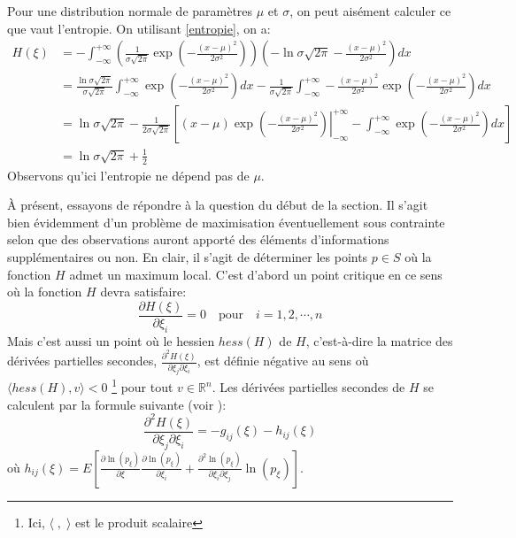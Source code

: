 \documentclass[11pt, letterpaper]{article}
\begin{document}
	Pour une distribution normale de paramètres $\mu$ et $\sigma$, on peut aisément calculer ce que vaut l'entropie. On utilisant \eqref{entropie}, on a:
	\begin{align*}
	 H(\xi)&= -\int_{-\infty}^{+\infty}\left(\frac{1}{\sigma\sqrt{2\pi}}\exp\left(-\frac{(x-\mu)^2}{2\sigma^2}\right)\right)\left(-\ln\sigma\sqrt{2\pi}-\frac{(x-\mu)^2}{2\sigma^2}\right)dx\\
	 &=\frac{\ln\sigma\sqrt{2\pi}}{\sigma\sqrt{2\pi}}\int_{-\infty}^{+\infty}\exp\left(-\frac{(x-\mu)^2}{2\sigma^2}\right)dx-\frac{1}{\sigma\sqrt{2\pi}}\int_{-\infty}^{+\infty}-\frac{(x-\mu)^2}{2\sigma^2}\exp\left(-\frac{(x-\mu)^2}{2\sigma^2}\right)dx\\
	 &=\ln\sigma\sqrt{2\pi}-\frac{1}{2\sigma\sqrt{2\pi}}\left[\left.(x-\mu)\exp\left(-\frac{(x-\mu)^2}{2\sigma^2}\right)\right|_{-\infty}^{+\infty}-\int_{-\infty}^{+\infty}\exp\left(-\frac{(x-\mu)^2}{2\sigma^2}\right)dx\right]\\
	 &=\ln\sigma\sqrt{2\pi}+\frac{1}{2}
	\end{align*}
	Observons qu'ici l'entropie ne dépend pas de $\mu$.
	\newline
	
	À présent, essayons de répondre à la question du début de la section. Il s'agit bien évidemment d'un problème de maximisation éventuellement sous contrainte selon que des observations auront apporté des éléments d'informations supplémentaires ou non. En clair, il s'agit de déterminer les points $p\in S$ où la fonction $H$ admet un maximum local. C'est d'abord un point critique en ce sens où la fonction $H$ devra satisfaire:
	\begin{equation*}
	    \frac{\partial H(\xi)}{\partial \xi_i}=0 \quad\text{pour}\quad i=1,2, \cdots, n
	\end{equation*}
	Mais c'est aussi un point où le hessien $hess(H)$ de $H$, c'est-à-dire la matrice des dérivées partielles secondes, $\frac{\partial^2 H(\xi)}{\partial \xi_j \partial\xi_ i}$, est définie négative au sens où $\langle hess(H), v \rangle<0$ \footnote{Ici, $\langle\;,\;\rangle$ est le produit scalaire} pour tout $v\in\mathbb{R}^n$. Les dérivées partielles secondes de $H$ se calculent par la formule suivante (voir \cite[Proposition 3.5.3]{calin2014geometric}):
	\begin{equation}\label{entropie_metrique}
	    \frac{\partial^2 H(\xi)}{\partial \xi_j \partial\xi_ i}=-g_{ij}(\xi)-h_{ij}(\xi)
	\end{equation}
	où $h_{ij}(\xi)=E\left[\frac{\partial\ln(p_{\xi})}{\partial\xi}\frac{\partial\ln(p_{\xi})}{\partial\xi_i}+\frac{\partial^2\ln(p_{\xi})}{\partial \xi_i \partial\xi_j}\ln(p_{\xi})\right]$.\\
	
\end{document}
